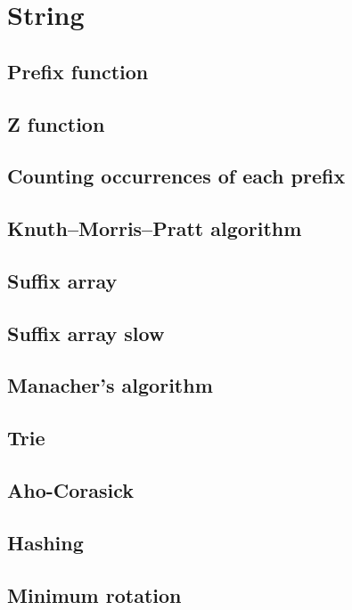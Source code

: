 \section{String}

\subsection{Prefix function}

\subsection{Z function}

\subsection{Counting occurrences of each prefix}

\subsection{Knuth–Morris–Pratt algorithm}

\subsection{Suffix array}

\subsection{Suffix array slow}

\subsection{Manacher's algorithm}

\subsection{Trie}

\subsection{Aho-Corasick}

\subsection{Hashing}

\subsection{Minimum rotation}
